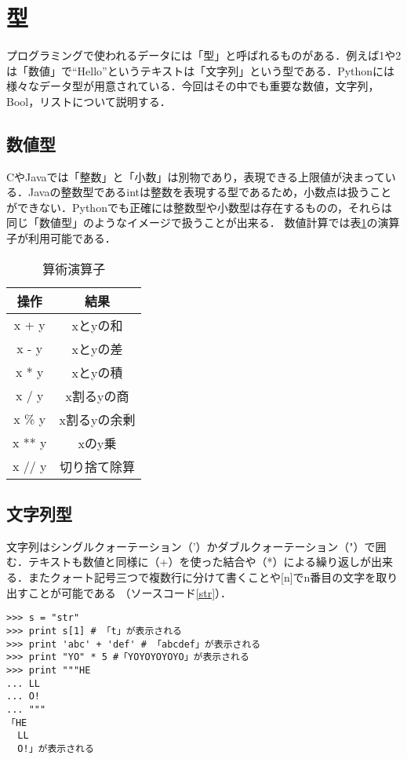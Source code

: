 \section{型}
プログラミングで使われるデータには「型」と呼ばれるものがある．例えば1や2は「数値」で``Hello''というテキストは「文字列」という型である．Pythonには様々なデータ型が用意されている．今回はその中でも重要な数値，文字列，Bool，リストについて説明する．
\subsection{数値型}
CやJavaでは「整数」と「小数」は別物であり，表現できる上限値が決まっている．Javaの整数型であるintは整数を表現する型であるため，小数点は扱うことができない．Pythonでも正確には整数型や小数型は存在するものの，それらは同じ「数値型」のようなイメージで扱うことが出来る．
数値計算では表\ref{arithmetic_operator}の演算子が利用可能である．

\begin{table}[h]
\centering
 \caption{算術演算子}
  \begin{tabular}{|c|c|} \hline
    操作 & 結果  \\ \hline \hline
    x + y & xとyの和 \\ \hline
    x - y & xとyの差 \\ \hline
    x * y & xとyの積 \\ \hline
    x / y & x割るyの商 \\ \hline
    x \% y & x割るyの余剰 \\ \hline
    x ** y & xのy乗 \\ \hline
    x // y & 切り捨て除算 \\ \hline
  \end{tabular} 
 \label{arithmetic_operator}
\end{table}

\subsection{文字列型}
文字列はシングルクォーテーション（'）かダブルクォーテーション（"）で囲む．テキストも数値と同様に（+）を使った結合や（*）による繰り返しが出来る．またクォート記号三つで複数行に分けて書くことや[n]でn番目の文字を取り出すことが可能である （ソースコード\ref{str}）．
\begin{lstlisting}[caption=文字列の操作, label=str]
>>> s = "str"
>>> print s[1] # 「t」が表示される
>>> print 'abc' + 'def' # 「abcdef」が表示される
>>> print "YO" * 5 #「YOYOYOYOYO」が表示される 
>>> print """HE
... LL
... O!
... """
「HE
  LL
  O!」が表示される
\end{lstlisting}

